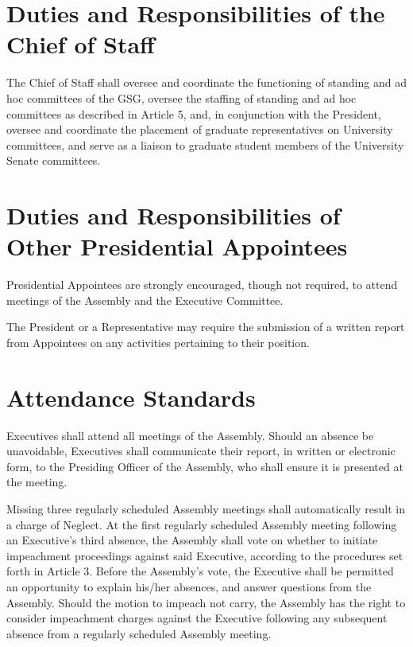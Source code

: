 \section{Duties and Responsibilities of the Chief of Staff}
\begin{bylaws-number}
	\item The Chief of Staff shall oversee and coordinate the functioning of standing and ad hoc committees of the GSG, oversee the staffing of standing and ad hoc committees as described in Article 5, and, in conjunction with the President, oversee and coordinate the placement of graduate representatives on University committees, and serve as a liaison to graduate student members of the University Senate committees.
\end{bylaws-number}

\section{Duties and Responsibilities of Other Presidential Appointees}
\begin{bylaws-number}
  \item Presidential Appointees are strongly encouraged, though not required, to attend meetings of the Assembly and the Executive Committee.
  \item The President or a Representative may require the submission of a written report from Appointees on any activities pertaining to their position.
\end{bylaws-number}

\section{Attendance Standards}
\begin{bylaws-number}
  \item Executives shall attend all meetings of the Assembly. Should an absence be unavoidable, Executives shall communicate their report, in written or electronic form, to the Presiding Officer of the Assembly, who shall ensure it is presented at the meeting.
  \item Missing three regularly scheduled Assembly meetings shall automatically result in a charge of Neglect. At the first regularly scheduled Assembly meeting following an Executive’s third absence, the Assembly shall vote on whether to initiate impeachment proceedings against said Executive, according to the procedures set forth in Article 3. Before the Assembly’s vote, the Executive shall be permitted an opportunity to explain his/her absences, and answer questions from the Assembly. Should the motion to impeach not carry, the Assembly has the right to consider impeachment charges against the Executive following any subsequent absence from a regularly scheduled Assembly meeting.
\end{bylaws-number}